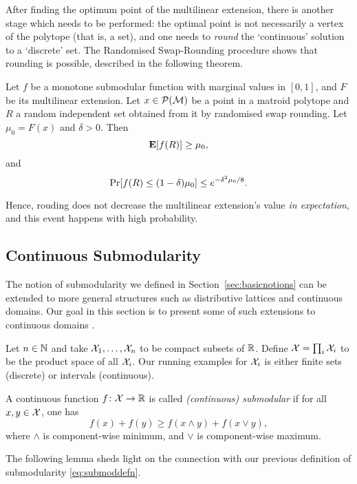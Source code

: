 After finding the optimum point of the multilinear extension, there is another stage which needs to be performed: the optimal point is not necessarily a vertex of the polytope (that is, a set), and one needs to \emph{round} the `continuous' solution to a `discrete' set. The Randomised Swap-Rounding procedure shows that rounding is possible, described in the following theorem.
\begin{theorem}\label{thm:swaprounding}
    Let $f$ be a monotone submodular function with marginal values in $[0, 1]$, and $F$ be its multilinear extension. Let $x\in \mathcal{P}(\mathcal{M})$ be a point in a matroid polytope and $R$ a random independent set obtained from it by randomised swap rounding. Let $\mu_0 = F(x)$ and $\delta > 0$. Then
    \[
        \mathbf{E}[f(R)] \geq \mu_0,
    \]
    and
    \[
        \mathop{\mathrm{Pr}}[f(R) \leq (1-\delta)\mu_0] \leq e^{-\delta^2\mu_0/8}.
    \]
\end{theorem}
Hence, rouding does not decrease the multilinear extension's value \emph{in expectation}, and this event happens with high probability.

\subsection{Continuous Submodularity}\label{sec:contsubmod}
The notion of submodularity we defined in Section~\ref{sec:basicnotions} can be extended to more general structures such as distributive lattices and continuous domains. Our goal in this section is to present some of such extensions to continuous domains \citep{bach2016submodular}.

Let $n\in\mathbb{N}$ and take $\mathcal{X}_1, \ldots, \mathcal{X}_n$ to be compact subsets of $\mathbb{R}$. Define $\mathcal{X} = \prod_i \mathcal{X}_i$ to be the product space of all $\mathcal{X}_i$. Our running examples for $\mathcal{X}_i$ is either finite sets (discrete) or intervals (continuous).

\begin{definition}
    A continuous function $f\colon \mathcal{X} \to \mathbb{R}$ is called \emph{(continuous) submodular} if for all $x,y\in\mathcal{X}$, one has 
    \begin{equation}\label{eq:continuoussubmoddef}
        f(x) + f(y) \geq f(x\wedge y) + f(x \vee y),
    \end{equation}
    where $\wedge$ is component-wise minimum, and $\vee$ is component-wise maximum.
\end{definition}

The following lemma sheds light on the connection with our previous definition of submodularity \eqref{eq:submoddefn}.


